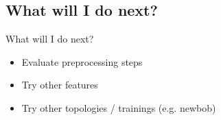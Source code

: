 \subsection{What will I do next?}
\begin{frame}{What will I do next?}
    \begin{itemize}
        \item Evaluate preprocessing steps
        \item Try other features
        \item Try other topologies / trainings (e.g. newbob)
    \end{itemize}
\end{frame}

